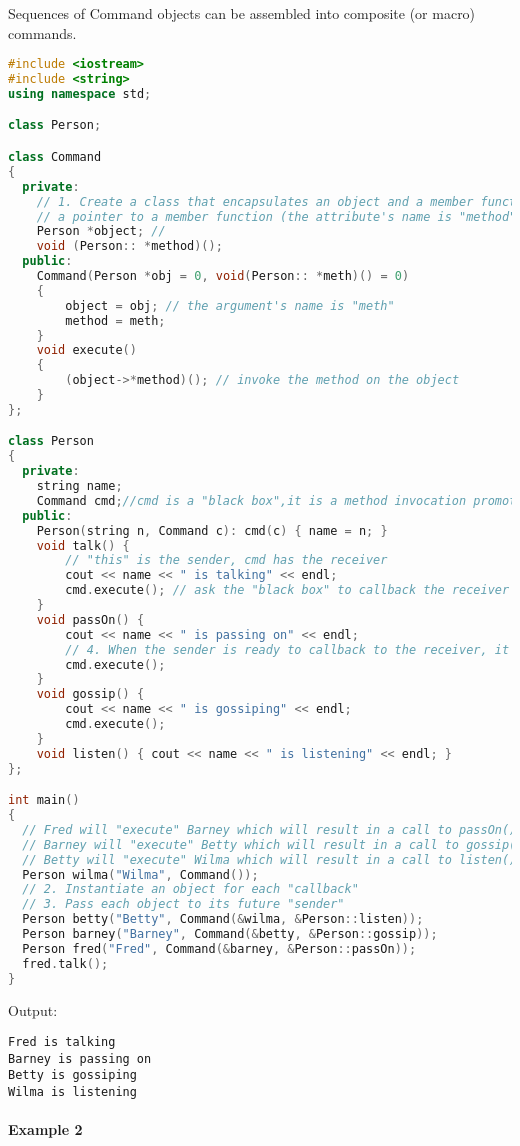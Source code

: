 \documentclass{book}
\begin{document}
Sequences of Command objects can be assembled into composite (or macro) commands.
\begin{lstlisting}[caption={Command pattern sample code 1, commandexample.cpp},label={lst:cm},language=C++]
#include <iostream>
#include <string>
using namespace std;

class Person;

class Command
{
  private:
    // 1. Create a class that encapsulates an object and a member function
    // a pointer to a member function (the attribute's name is "method")
    Person *object; //    
    void (Person:: *method)();
  public:
    Command(Person *obj = 0, void(Person:: *meth)() = 0)
    {
        object = obj; // the argument's name is "meth"
        method = meth;
    }
    void execute()
    {
        (object->*method)(); // invoke the method on the object
    }
};

class Person
{
  private:
    string name;
    Command cmd;//cmd is a "black box",it is a method invocation promoted to "full object status"
  public:
    Person(string n, Command c): cmd(c) { name = n; }
    void talk() {
        // "this" is the sender, cmd has the receiver
        cout << name << " is talking" << endl;
        cmd.execute(); // ask the "black box" to callback the receiver
    }
    void passOn() {
        cout << name << " is passing on" << endl;
        // 4. When the sender is ready to callback to the receiver, it calls execute()
        cmd.execute(); 
    }
    void gossip() {
        cout << name << " is gossiping" << endl;
        cmd.execute();
    }
    void listen() { cout << name << " is listening" << endl; }
};

int main()
{
  // Fred will "execute" Barney which will result in a call to passOn()
  // Barney will "execute" Betty which will result in a call to gossip()
  // Betty will "execute" Wilma which will result in a call to listen()
  Person wilma("Wilma", Command());
  // 2. Instantiate an object for each "callback"
  // 3. Pass each object to its future "sender"
  Person betty("Betty", Command(&wilma, &Person::listen));
  Person barney("Barney", Command(&betty, &Person::gossip));
  Person fred("Fred", Command(&barney, &Person::passOn));
  fred.talk();
}
\end{lstlisting}
Output:
\begin{verbatim}
Fred is talking
Barney is passing on
Betty is gossiping
Wilma is listening
\end{verbatim}

\paragraph{Example 2}\mbox{}
\end{document}
